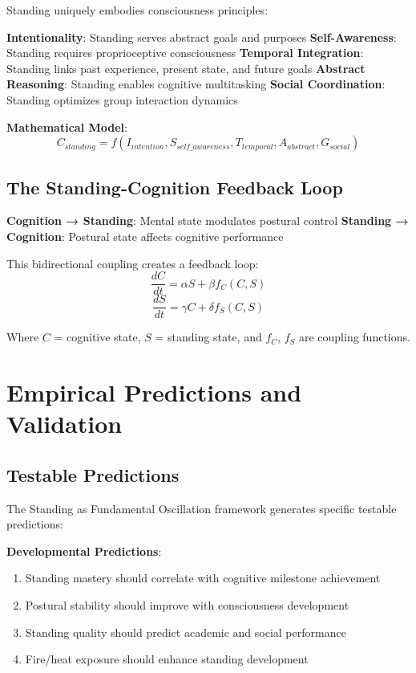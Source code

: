 \documentclass[12pt]{article}
\begin{document}
Standing uniquely embodies consciousness principles:

\textbf{Intentionality}: Standing serves abstract goals and purposes
\textbf{Self-Awareness}: Standing requires proprioceptive consciousness
\textbf{Temporal Integration}: Standing links past experience, present state, and future goals
\textbf{Abstract Reasoning}: Standing enables cognitive multitasking
\textbf{Social Coordination}: Standing optimizes group interaction dynamics

\textbf{Mathematical Model}:
$$C_{standing} = f(I_{intention}, S_{self\_awareness}, T_{temporal}, A_{abstract}, G_{social})$$

\subsection{The Standing-Cognition Feedback Loop}

\textbf{Cognition → Standing}: Mental state modulates postural control
\textbf{Standing → Cognition}: Postural state affects cognitive performance

This bidirectional coupling creates a feedback loop:
$$\frac{dC}{dt} = \alpha S + \beta f_C(C, S)$$
$$\frac{dS}{dt} = \gamma C + \delta f_S(C, S)$$

Where $C$ = cognitive state, $S$ = standing state, and $f_C$, $f_S$ are coupling functions.

\section{Empirical Predictions and Validation}

\subsection{Testable Predictions}

The Standing as Fundamental Oscillation framework generates specific testable predictions:

\textbf{Developmental Predictions}:
\begin{enumerate}
\item Standing mastery should correlate with cognitive milestone achievement
\item Postural stability should improve with consciousness development
\item Standing quality should predict academic and social performance
\item Fire/heat exposure should enhance standing development
\end{enumerate}
\end{document}
